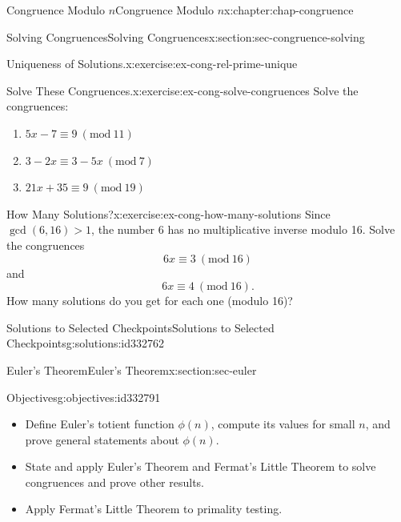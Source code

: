\documentclass[oneside,10pt,]{book}
\numberwithin{equation}{section}
\newcommand{\Mod}[1]{\ \left(\mathrm{mod}\ #1\right)}
\newcommand{\gt}{>}
\begin{document}
\begin{chapterptx}{Congruence Modulo \(n\)}{}{Congruence Modulo \(n\)}{}{}{x:chapter:chap-congruence}
\begin{sectionptx}{Solving Congruences}{}{Solving Congruences}{}{}{x:section:sec-congruence-solving}
\begin{inlineexercise}{Uniqueness of Solutions.}{x:exercise:ex-cong-rel-prime-unique}
\end{inlineexercise}
\begin{inlineexercise}{Solve These Congruences.}{x:exercise:ex-cong-solve-congruences}%
Solve the congruences:%
\begin{enumerate}[label=(\alph*)]
\item{}\(\displaystyle 5x - 7 \equiv 9 \Mod{11}\)%
\item{}\(\displaystyle 3 - 2x \equiv 3 - 5x \Mod{7}\)%
\item{}\(\displaystyle 21x + 35 \equiv 9 \Mod{19}\)%
\end{enumerate}
%
\end{inlineexercise}
\begin{inlineexercise}{How Many Solutions?}{x:exercise:ex-cong-how-many-solutions}%
Since \(\gcd(6,16) \gt 1\), the number 6 has no multiplicative inverse modulo 16. Solve the congruences%
\begin{equation*}
6x \equiv 3 \Mod{16}
\end{equation*}
and%
\begin{equation*}
6x \equiv 4 \Mod{16}\text{.}
\end{equation*}
How many solutions do you get for each one (modulo 16)?%
\end{inlineexercise}
%
%
\typeout{************************************************}
\typeout{************************************************}
%
\begin{solutions-subsection}{Solutions to Selected Checkpoints}{}{Solutions to Selected Checkpoints}{}{}{g:solutions:id332762}
\end{solutions-subsection}
\end{sectionptx}
%
%
\typeout{************************************************}
\typeout{************************************************}
%
\begin{sectionptx}{Euler's Theorem}{}{Euler's Theorem}{}{}{x:section:sec-euler}
\begin{objectives}{Objectives}{g:objectives:id332791}
%
\begin{itemize}[label=\textbullet]
\item{}Define Euler's totient function \(\phi(n)\), compute its values for small \(n\), and prove general statements about \(\phi(n)\).%
\item{}State and apply Euler's Theorem and Fermat's Little Theorem to solve congruences and prove other results.%
\item{}Apply Fermat's Little Theorem to primality testing.%

\end{itemize}
\end{objectives}
\end{sectionptx}
\end{chapterptx}
\end{document}
